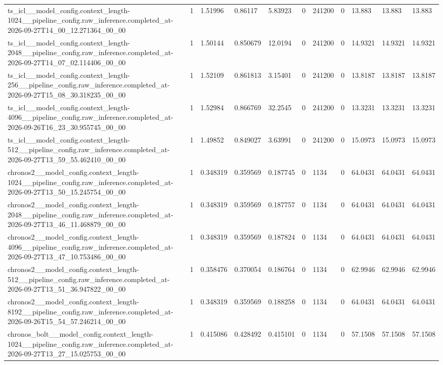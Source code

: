 \begin{tabular}{lllllllllll}
ts\_icl\_\_model\_config.context\_length-1024\_\_pipeline\_config.raw\_inference.completed\_at-2026-09-27T14\_00\_12.271364\_00\_00 & 1 & 1.51996 & 0.86117 & 5.83923 & 0 & 241200 & 0 & 13.883 & 13.883 & 13.883 \\
ts\_icl\_\_model\_config.context\_length-2048\_\_pipeline\_config.raw\_inference.completed\_at-2026-09-27T14\_07\_02.114406\_00\_00 & 1 & 1.50144 & 0.850679 & 12.0194 & 0 & 241200 & 0 & 14.9321 & 14.9321 & 14.9321 \\
ts\_icl\_\_model\_config.context\_length-256\_\_pipeline\_config.raw\_inference.completed\_at-2026-09-27T15\_08\_30.318235\_00\_00 & 1 & 1.52109 & 0.861813 & 3.15401 & 0 & 241200 & 0 & 13.8187 & 13.8187 & 13.8187 \\
ts\_icl\_\_model\_config.context\_length-4096\_\_pipeline\_config.raw\_inference.completed\_at-2026-09-26T16\_23\_30.955745\_00\_00 & 1 & 1.52984 & 0.866769 & 32.2545 & 0 & 241200 & 0 & 13.3231 & 13.3231 & 13.3231 \\
ts\_icl\_\_model\_config.context\_length-512\_\_pipeline\_config.raw\_inference.completed\_at-2026-09-27T13\_59\_55.462410\_00\_00 & 1 & 1.49852 & 0.849027 & 3.63991 & 0 & 241200 & 0 & 15.0973 & 15.0973 & 15.0973 \\
chronos2\_\_model\_config.context\_length-1024\_\_pipeline\_config.raw\_inference.completed\_at-2026-09-27T13\_50\_15.245754\_00\_00 & 1 & 0.348319 & 0.359569 & 0.187745 & 0 & 1134 & 0 & 64.0431 & 64.0431 & 64.0431 \\
chronos2\_\_model\_config.context\_length-2048\_\_pipeline\_config.raw\_inference.completed\_at-2026-09-27T13\_46\_11.468879\_00\_00 & 1 & 0.348319 & 0.359569 & 0.187757 & 0 & 1134 & 0 & 64.0431 & 64.0431 & 64.0431 \\
chronos2\_\_model\_config.context\_length-4096\_\_pipeline\_config.raw\_inference.completed\_at-2026-09-27T13\_47\_10.753486\_00\_00 & 1 & 0.348319 & 0.359569 & 0.187824 & 0 & 1134 & 0 & 64.0431 & 64.0431 & 64.0431 \\
chronos2\_\_model\_config.context\_length-512\_\_pipeline\_config.raw\_inference.completed\_at-2026-09-27T13\_51\_36.947822\_00\_00 & 1 & 0.358476 & 0.370054 & 0.186764 & 0 & 1134 & 0 & 62.9946 & 62.9946 & 62.9946 \\
chronos2\_\_model\_config.context\_length-8192\_\_pipeline\_config.raw\_inference.completed\_at-2026-09-26T15\_54\_57.246214\_00\_00 & 1 & 0.348319 & 0.359569 & 0.188258 & 0 & 1134 & 0 & 64.0431 & 64.0431 & 64.0431 \\
chronos\_bolt\_\_model\_config.context\_length-1024\_\_pipeline\_config.raw\_inference.completed\_at-2026-09-27T13\_27\_15.025753\_00\_00 & 1 & 0.415086 & 0.428492 & 0.415101 & 0 & 1134 & 0 & 57.1508 & 57.1508 & 57.1508 \\

\end{tabular}
